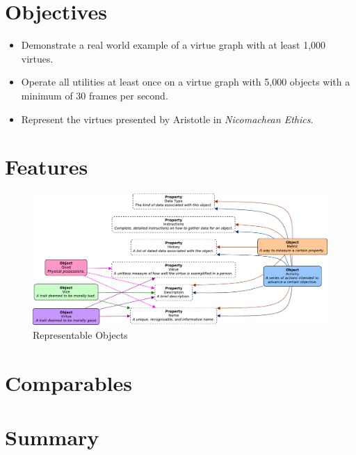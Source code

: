 \documentclass{article}
\begin{document}
\section{Objectives}

\begin{itemize}
    \item Demonstrate a real world example of a virtue graph with at least 1,000 virtues.
    \item Operate all utilities at least once on a virtue graph with 5,000 objects with a minimum of 30 frames per second.
    \item Represent the virtues presented by Aristotle in \textit{Nicomachean Ethics}.
\end{itemize}

\section{Features}

\begin{figure}[h]
    \includegraphics[width=\linewidth]{objects.pdf}
    \caption{Representable Objects}
    \label{fig:objects}
\end{figure}

\section{Comparables}


\section{Summary}

\end{document}
